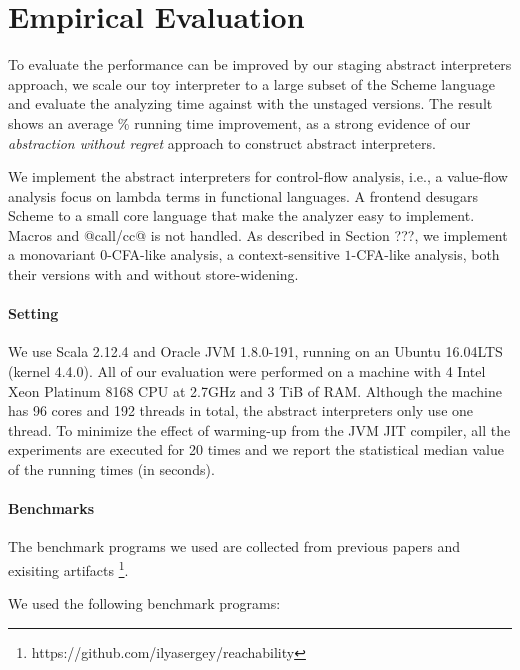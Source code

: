 \section{Empirical Evaluation} \label{evaluation}

To evaluate the performance can be improved by our staging abstract interpreters
approach, we scale our toy interpreter to a large subset of the Scheme language
and evaluate the analyzing time against with the unstaged versions. The result
shows an average \% running time improvement, as a strong evidence of
our \textit{abstraction without regret} approach to construct abstract
interpreters.

We implement the abstract interpreters for control-flow analysis, i.e., a
value-flow analysis focus on lambda terms in functional languages. A frontend
desugars Scheme to a small core language that make the analyzer easy to
implement. Macros and @call/cc@ is not handled. As described in Section ???, we
implement a monovariant 0-CFA-like analysis, a context-sensitive $1$-CFA-like
analysis, both their versions with and without store-widening.

\paragraph{Setting}

We use Scala 2.12.4 and Oracle JVM 1.8.0-191, running on an Ubuntu 16.04LTS
(kernel 4.4.0). All of our evaluation were performed on a machine with 4 Intel
Xeon Platinum 8168 CPU at 2.7GHz and 3 TiB of RAM. Although the machine has 96
cores and 192 threads in total, the abstract interpreters only use one thread.
To minimize the effect of warming-up from the JVM JIT compiler, all the
experiments are executed for 20 times and we report the statistical median value
of the running times (in seconds).

\paragraph{Benchmarks} 
The benchmark programs we used are collected from previous papers
\cite{Johnson:2013:OAA:2500365.2500604, ashley:practical,
DBLP:journals/corr/abs-1102-3676} and exisiting artifacts
\footnote{https://github.com/ilyasergey/reachability}.

We used the following benchmark programs:

